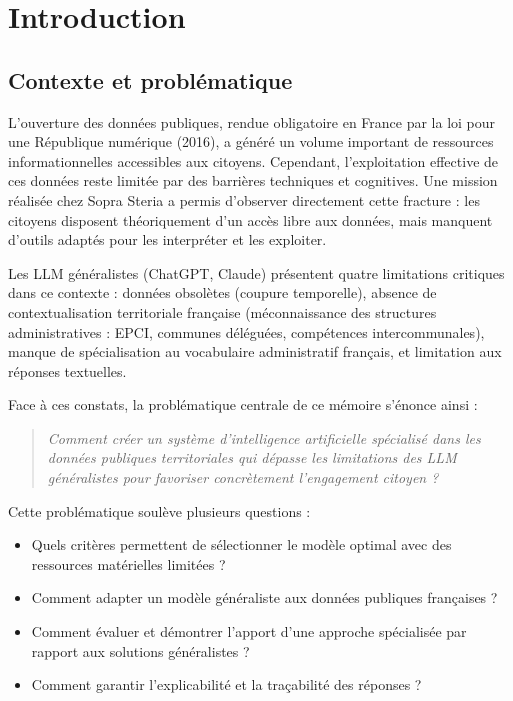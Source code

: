 
\chapter{Introduction}

\section{Contexte et problématique}

L'ouverture des données publiques, rendue obligatoire en France par la loi pour une République numérique (2016), a généré un volume important de ressources informationnelles accessibles aux citoyens. Cependant, l'exploitation effective de ces données reste limitée par des barrières techniques et cognitives. Une mission réalisée chez Sopra Steria a permis d'observer directement cette fracture : les citoyens disposent théoriquement d'un accès libre aux données, mais manquent d'outils adaptés pour les interpréter et les exploiter.

Les LLM généralistes (ChatGPT, Claude) présentent quatre limitations critiques dans ce contexte : données obsolètes (coupure temporelle), absence de contextualisation territoriale française (méconnaissance des structures administratives : EPCI, communes déléguées, compétences intercommunales), manque de spécialisation au vocabulaire administratif français, et limitation aux réponses textuelles.

Face à ces constats, la problématique centrale de ce mémoire s'énonce ainsi :

\begin{quote}
\textit{Comment créer un système d'intelligence artificielle spécialisé dans les données publiques territoriales qui dépasse les limitations des LLM généralistes pour favoriser concrètement l'engagement citoyen ?}
\end{quote}

Cette problématique soulève plusieurs questions :

\begin{itemize}
    \item Quels critères permettent de sélectionner le modèle optimal avec des ressources matérielles limitées ?
    \item Comment adapter un modèle généraliste aux données publiques françaises ?
    \item Comment évaluer et démontrer l'apport d'une approche spécialisée par rapport aux solutions généralistes ?
    \item Comment garantir l'explicabilité et la traçabilité des réponses ?
\end{itemize}

